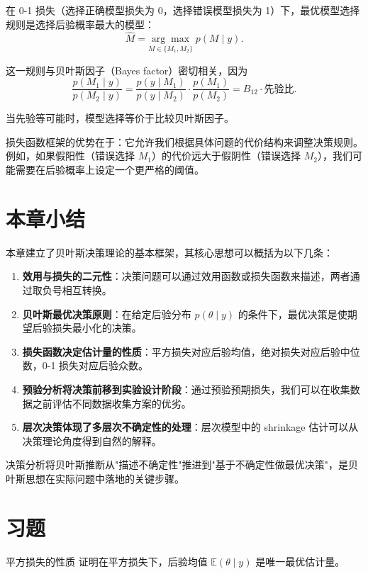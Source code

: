 在 0-1 损失（选择正确模型损失为 0，选择错误模型损失为 1）下，最优模型选择规则是选择后验概率最大的模型：
\[
\hat{M} = \underset{M \in \{M_1, M_2\}}{\arg\max} \; p(M \mid y).
\]

这一规则与贝叶斯因子（Bayes factor）密切相关，因为
\[
\frac{p(M_1 \mid y)}{p(M_2 \mid y)} = \frac{p(y \mid M_1)}{p(y \mid M_2)} \cdot \frac{p(M_1)}{p(M_2)} = B_{12} \cdot \text{先验比}.
\]

当先验等可能时，模型选择等价于比较贝叶斯因子。

损失函数框架的优势在于：它允许我们根据具体问题的代价结构来调整决策规则。例如，如果假阳性（错误选择 $M_1$）的代价远大于假阴性（错误选择 $M_2$），我们可能需要在后验概率上设定一个更严格的阈值。

\section{本章小结}

本章建立了贝叶斯决策理论的基本框架，其核心思想可以概括为以下几条：

\begin{enumerate}
  \item \textbf{效用与损失的二元性}：决策问题可以通过效用函数或损失函数来描述，两者通过取负号相互转换。
  \item \textbf{贝叶斯最优决策原则}：在给定后验分布 $p(\theta \mid y)$ 的条件下，最优决策是使期望后验损失最小化的决策。
  \item \textbf{损失函数决定估计量的性质}：平方损失对应后验均值，绝对损失对应后验中位数，0-1 损失对应后验众数。
  \item \textbf{预验分析将决策前移到实验设计阶段}：通过预验预期损失，我们可以在收集数据之前评估不同数据收集方案的优劣。
  \item \textbf{层次决策体现了多层次不确定性的处理}：层次模型中的 shrinkage 估计可以从决策理论角度得到自然的解释。
\end{enumerate}

决策分析将贝叶斯推断从"描述不确定性"推进到"基于不确定性做最优决策"，是贝叶斯思想在实际问题中落地的关键步骤。

\section{习题}\label{sec:ch9-exercises}

\begin{Exercise}{平方损失的性质}\label{exr:ch9-1}
证明在平方损失下，后验均值 $\mathbb{E}(\theta \mid y)$ 是唯一最优估计量。
\end{Exercise}

